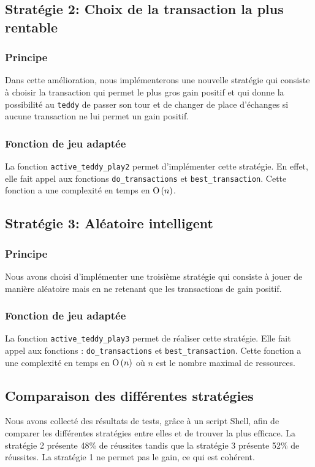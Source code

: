 \documentclass[12pt]{article}
\begin{document}
        \subsection{Stratégie 2: Choix de la transaction la plus rentable}
        \subsubsection{Principe}
        Dans cette amélioration, nous implémenterons une nouvelle stratégie qui consiste à choisir la transaction qui permet le plus gros gain positif et qui donne la possibilité au \texttt{teddy} de passer son tour et de changer de place d'échanges si aucune transaction ne lui permet un gain positif.
        \subsubsection{Fonction de jeu adaptée}
        La fonction \texttt{active\_teddy\_play2} permet d'implémenter cette stratégie. En effet, elle fait appel aux fonctions \texttt{do\_transactions} et \texttt{best\_transaction}.  Cette fonction a une complexité en temps en ${\text{O}}\left(n\right)$.
        \subsection{Stratégie 3: Aléatoire intelligent}
        \subsubsection{Principe}
        Nous avons choisi d'implémenter une troisième stratégie qui consiste à jouer de manière aléatoire mais en ne retenant que les transactions de gain positif.
        \subsubsection{Fonction de jeu adaptée}
        La fonction \texttt{active\_teddy\_play3} permet de réaliser cette stratégie. Elle fait appel aux fonctions : \texttt{do\_transactions} et \texttt{best\_transaction}. Cette fonction a une complexité en temps en ${\text{O}}\left(n\right)$ où $n$ est le nombre maximal de ressources.
        \subsection{Comparaison des différentes stratégies}
        Nous avons collecté des résultats de tests, grâce à un script Shell, afin de comparer les différentes stratégies entre elles et de trouver la plus efficace. La stratégie 2 présente 48\% de réussites tandis que la stratégie 3 présente 52\% de réussites. La stratégie 1 ne permet pas le gain, ce qui est cohérent. 
\end{document}
